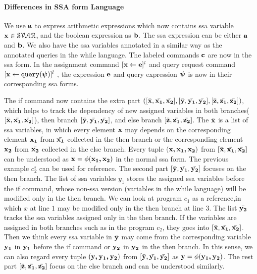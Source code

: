 \paragraph{Differences in SSA form Language}
We use ${\boldsymbol{\mathbf{a}}}$ to express arithmetic expressions which now contains ssa variable ${\boldsymbol{\mathbf{x}}} \in \mathcal{SVAR}$, 
and the boolean expression as ${\boldsymbol{\mathbf{b}}}$. 
%
The ssa expression can be either ${\boldsymbol{\mathbf{a}}}$ and ${\boldsymbol{\mathbf{b}}}$. 
We also have the ssa variables annotated in a similar way as the annotated queries in the while language.
%
The labeled commands ${\boldsymbol{\mathbf{c}}}$ are now in the ssa form. 
In the assignment command $[\mathrel{ {\boldsymbol{\mathbf{x}}} \leftarrow  {\boldsymbol{\mathbf{e}}} }]^{l}$ and query request command 
$[\mathrel{ {{\boldsymbol{\mathbf{x}}}}  \leftarrow {\tt query}({{\boldsymbol{\mathbf{\psi}}}}) }]^{l}$ , 
the expression ${{\boldsymbol{\mathbf{e}}}}$ and query expression 
${\boldsymbol{\mathbf{\psi}}}$ is now in their corresponding ssa forms. 

{
The if command now contains the extra part 
$([\bar{{\boldsymbol{\mathbf{x}}}}, \bar{{\boldsymbol{\mathbf{x_1}}}}, \bar{{\boldsymbol{\mathbf{x_2}}}}] , 
[\bar{{\boldsymbol{\mathbf{y}}}}, \bar{{\boldsymbol{\mathbf{y_1}}}}, \bar{{\boldsymbol{\mathbf{y_2}}}}],
[\bar{{\boldsymbol{\mathbf{z}}}}, \bar{{\boldsymbol{\mathbf{z_1}}}}, \bar{{\boldsymbol{\mathbf{z_2}}}}] )$, 
which helps to track the dependency of new assigned variables in both branches($[\bar{{\boldsymbol{\mathbf{x}}}}, \bar{{\boldsymbol{\mathbf{x_1}}}}, \bar{{\boldsymbol{\mathbf{x_2}}}}]$), 
then branch $[\bar{{\boldsymbol{\mathbf{y}}}}, \bar{{\boldsymbol{\mathbf{y_1}}}}, \bar{{\boldsymbol{\mathbf{y_2}}}}]$, 
and else branch $[\bar{{\boldsymbol{\mathbf{z}}}}, \bar{{\boldsymbol{\mathbf{z_1}}}}, \bar{{\boldsymbol{\mathbf{z_2}}}}] $. 
The $\bar{{\boldsymbol{\mathbf{x}}}}$ is a list of ssa variables, in which every element ${\boldsymbol{\mathbf{x}}}$ may depends on the corresponding element ${\boldsymbol{\mathbf{x_1}}}$ from $\bar{{\boldsymbol{\mathbf{x_1}}}}$ collected in the then branch or the corresponding element ${\boldsymbol{\mathbf{x_2}}}$ from $\bar{{\boldsymbol{\mathbf{x_2}}}}$ collected in the else branch. 
%
Every tuple $({\boldsymbol{\mathbf{x,x_1,x_2 }}})$ from $[\bar{{\boldsymbol{\mathbf{x}}}}, \bar{{\boldsymbol{\mathbf{x_1}}}}, \bar{{\boldsymbol{\mathbf{x_2}}}}]$ can be understood as ${\boldsymbol{\mathbf{x}}} = \phi({\boldsymbol{\mathbf{x_1,x_2}}})$ in the normal ssa form. 
The previous example $c_2^{s}$ can be used for reference. 
The second part $[\bar{{\boldsymbol{\mathbf{y}}}}, \bar{{\boldsymbol{\mathbf{y_1}}}}, \bar{{\boldsymbol{\mathbf{y_2}}}}]$ focuses on the then branch. 
The list of ssa variables $y_1$ stores the assigned ssa variables before the if command, whose non-ssa version (variables in the while language) will be modified only in the then branch. 
We can look at program $c_1$ as a reference,in which $x$ at line $1$ may be modified only in the then branch at line $3$. 
The list $\bar{{\boldsymbol{\mathbf{y_2}}}}$ tracks the ssa variables assigned only in the then branch. 
If the variables are assigned in both branches such as in the program $c_2$, they goes into $[\bar{{\boldsymbol{\mathbf{x}}}}, \bar{{\boldsymbol{\mathbf{x_1}}}}, \bar{{\boldsymbol{\mathbf{x_2}}}}]$. Then we think every ssa variable in $\bar{{\boldsymbol{\mathbf{y}}}}$ may come from the corresponding variable ${\boldsymbol{\mathbf{y_1}}}$ in $\bar{{\boldsymbol{\mathbf{y_1}}}}$ before the if command or ${\boldsymbol{\mathbf{y_2}}}$ in $\bar{{\boldsymbol{\mathbf{y_2}}}}$ in the then branch. 
In this sense, we can also regard every tuple $({\boldsymbol{\mathbf{y,y_1,y_2 }}})$ from $[\bar{{\boldsymbol{\mathbf{y}}}}, \bar{{\boldsymbol{\mathbf{y_1}}}}, \bar{{\boldsymbol{\mathbf{y_2}}}}]$ as ${\boldsymbol{\mathbf{y}}} = \phi({\boldsymbol{\mathbf{y_1,y_2}}})$. 
The rest part $[\bar{{\boldsymbol{\mathbf{z}}}}, \bar{{\boldsymbol{\mathbf{z_1}}}}, \bar{{\boldsymbol{\mathbf{z_2}}}}]$ focus on the else branch and can be understood similarly. 
}

